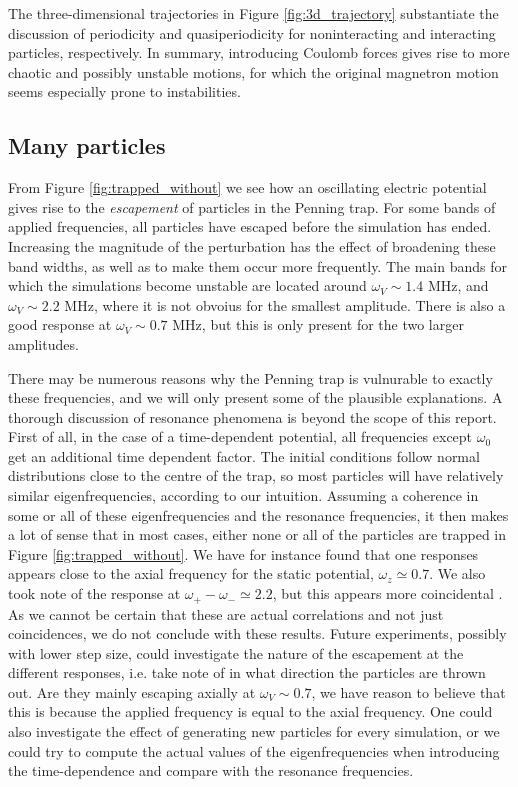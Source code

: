 The three-dimensional trajectories in Figure \ref{fig:3d_trajectory} substantiate the discussion of periodicity and quasiperiodicity for noninteracting and interacting particles, respectively. In summary, introducing Coulomb forces gives rise to more chaotic and possibly unstable motions, for which the original magnetron motion seems especially prone to instabilities.




\subsection{Many particles}


From Figure \ref{fig:trapped_without} we see how an oscillating electric potential gives rise to the \textit{escapement} of particles in the Penning trap. For some bands of applied frequencies, all particles have escaped before the simulation has ended. Increasing the magnitude of the perturbation has the effect of broadening these band widths, as well as to make them occur more frequently. The main bands for which the simulations become unstable are located around $\omega_V \sim 1.4$ MHz, and $\omega_V \sim 2.2$ MHz, where it is not obvoius for the smallest amplitude. There is also a good response at $\omega_V\sim 0.7$ MHz, but this is only present for the two larger amplitudes.

There may be numerous reasons why the Penning trap is vulnurable to exactly these frequencies, and we will only present some of the plausible explanations. A thorough discussion of resonance phenomena is beyond the scope of this report. First of all, in the case of a time-dependent potential, all frequencies except $\omega_0$ get an additional time dependent factor. The initial conditions follow normal distributions close to the centre of the trap, so most particles will have relatively similar eigenfrequencies, according to our intuition. Assuming a coherence in some or all of these eigenfrequencies and the resonance frequencies, it then makes a lot of sense that in most cases, either none or all of the particles are trapped in Figure \ref{fig:trapped_without}. We have for instance found that one responses appears close to the axial frequency for the static potential, $\omega_z \simeq 0.7$. We also took note of the response at $\omega_+ - \omega_- \simeq 2.2$, but this appears more coincidental . As we cannot be certain that these are actual correlations and not just coincidences, we do not conclude with these results. Future experiments, possibly with lower step size, could investigate the nature of the escapement at the different responses, i.e. take note of in what direction the particles are thrown out. Are they mainly escaping axially at $\omega_V \sim 0.7$, we have reason to believe that this is because the applied frequency is equal to the axial frequency. One could also investigate the effect of generating new particles for every simulation, or we could try to compute the actual values of the eigenfrequencies when introducing the time-dependence and compare with the resonance frequencies.


